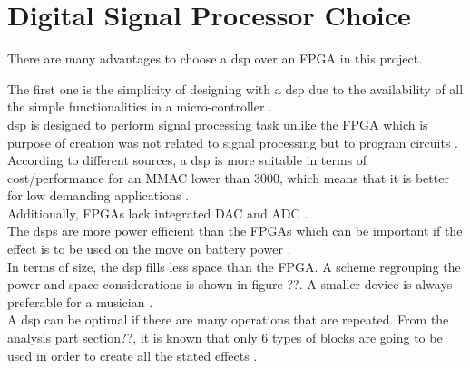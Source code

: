 \section{Digital Signal Processor Choice}

There are many advantages to choose a \gls{dsp} over an FPGA in this project. 

The first one is the simplicity of designing with a \gls{dsp} due to the availability of all the simple functionalities in a micro-controller \citep{eetimes}. \\

\gls{dsp} is designed to perform signal processing task unlike the FPGA which is purpose of creation was not related to signal processing but to program circuits \citep{eetimes}. \\

According to different sources, a \gls{dsp} is more suitable in terms of cost/performance for an MMAC lower than 3000, which means that it is better for low demanding applications \citep{eetimes}. \\

Additionally, FPGAs lack integrated DAC and ADC \citep{eetimes}. \\

The \gls{dsp}s are more power efficient than the FPGAs which can be important if the effect is to be used on the move on battery power \citep{rtcmag}. \\

In terms of size, the \gls{dsp} fills less space than the FPGA. A scheme regrouping the power and space considerations is shown in figure ??.  A smaller device is always preferable for a musician \citep{offchip}. \\

A \gls{dsp} can be optimal if there are many operations that are repeated. From the analysis part section??, it is known that only 6 types of blocks are going to be used in order to create all the stated effects \citep{eetimes} \citep{hunteng}. \\



